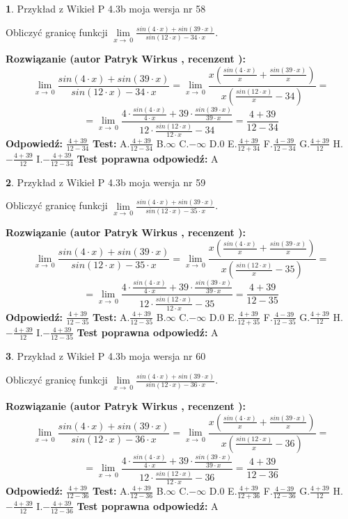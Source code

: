 \documentclass[12pt, a4paper]{article}
\theoremstyle{definition} %
\newtheorem{zad}{}
\newcommand{\zadStart}[1]{\begin{zad}#1\newline}
\newcommand{\zadStop}{\end{zad}}
\newcommand{\rozwStart}[2]{\noindent \textbf{Rozwiązanie (autor #1 , recenzent #2): }\newline}
\newcommand{\rozwStop}{\newline}
\newcommand{\odpStart}{\noindent \textbf{Odpowiedź:}\newline}
\newcommand{\odpStop}{\newline}
\newcommand{\testStart}{\noindent \textbf{Test:}\newline}
\newcommand{\testStop}{\newline}
\newcommand{\kluczStart}{\noindent \textbf{Test poprawna odpowiedź:}\newline}
\newcommand{\kluczStop}{\newline}
\begin{document}
\zadStart{Przykład z Wikieł P 4.3b moja wersja nr 58}


Obliczyć granicę funkcji $\lim\limits_{x\to\ 0}\frac{sin(4 \cdot x)+sin(39 \cdot x)}{sin(12 \cdot x)-34 \cdot x}$.
\zadStop
\rozwStart{Patryk Wirkus}{}
$$\lim\limits_{x\to\ 0}\frac{sin(4 \cdot x)+sin(39 \cdot x)}{sin(12 \cdot x)-34 \cdot x}=\lim\limits_{x\to\ 0}\frac{x(\frac{sin(4 \cdot x)}{x}+\frac{sin(39 \cdot x)}{x})}{x(\frac{sin(12 \cdot x)}{x}-34)}=$$
$$=\lim\limits_{x\to\ 0}\frac{4 \cdot \frac{sin(4 \cdot x)}{4 \cdot x}+39 \cdot \frac{sin(39 \cdot x)}{39 \cdot x}}{12 \cdot \frac{sin(12 \cdot x)}{12 \cdot x}-34}=\frac{4+39}{12-34}$$
\rozwStop
\odpStart
$\frac{4+39}{12-34}$
\odpStop
\testStart
A.$\frac{4+39}{12-34}$
B.$\infty$
C.$-\infty$
D.$0$
E.$\frac{4+39}{12+34}$
F.$\frac{4-39}{12-34}$
G.$\frac{4+39}{12}$
H.$-\frac{4+39}{12}$
I.$-\frac{4+39}{12-34}$
\testStop
\kluczStart
A
\kluczStop



\zadStart{Przykład z Wikieł P 4.3b moja wersja nr 59}


Obliczyć granicę funkcji $\lim\limits_{x\to\ 0}\frac{sin(4 \cdot x)+sin(39 \cdot x)}{sin(12 \cdot x)-35 \cdot x}$.
\zadStop
\rozwStart{Patryk Wirkus}{}
$$\lim\limits_{x\to\ 0}\frac{sin(4 \cdot x)+sin(39 \cdot x)}{sin(12 \cdot x)-35 \cdot x}=\lim\limits_{x\to\ 0}\frac{x(\frac{sin(4 \cdot x)}{x}+\frac{sin(39 \cdot x)}{x})}{x(\frac{sin(12 \cdot x)}{x}-35)}=$$
$$=\lim\limits_{x\to\ 0}\frac{4 \cdot \frac{sin(4 \cdot x)}{4 \cdot x}+39 \cdot \frac{sin(39 \cdot x)}{39 \cdot x}}{12 \cdot \frac{sin(12 \cdot x)}{12 \cdot x}-35}=\frac{4+39}{12-35}$$
\rozwStop
\odpStart
$\frac{4+39}{12-35}$
\odpStop
\testStart
A.$\frac{4+39}{12-35}$
B.$\infty$
C.$-\infty$
D.$0$
E.$\frac{4+39}{12+35}$
F.$\frac{4-39}{12-35}$
G.$\frac{4+39}{12}$
H.$-\frac{4+39}{12}$
I.$-\frac{4+39}{12-35}$
\testStop
\kluczStart
A
\kluczStop



\zadStart{Przykład z Wikieł P 4.3b moja wersja nr 60}


Obliczyć granicę funkcji $\lim\limits_{x\to\ 0}\frac{sin(4 \cdot x)+sin(39 \cdot x)}{sin(12 \cdot x)-36 \cdot x}$.
\zadStop
\rozwStart{Patryk Wirkus}{}
$$\lim\limits_{x\to\ 0}\frac{sin(4 \cdot x)+sin(39 \cdot x)}{sin(12 \cdot x)-36 \cdot x}=\lim\limits_{x\to\ 0}\frac{x(\frac{sin(4 \cdot x)}{x}+\frac{sin(39 \cdot x)}{x})}{x(\frac{sin(12 \cdot x)}{x}-36)}=$$
$$=\lim\limits_{x\to\ 0}\frac{4 \cdot \frac{sin(4 \cdot x)}{4 \cdot x}+39 \cdot \frac{sin(39 \cdot x)}{39 \cdot x}}{12 \cdot \frac{sin(12 \cdot x)}{12 \cdot x}-36}=\frac{4+39}{12-36}$$
\rozwStop
\odpStart
$\frac{4+39}{12-36}$
\odpStop
\testStart
A.$\frac{4+39}{12-36}$
B.$\infty$
C.$-\infty$
D.$0$
E.$\frac{4+39}{12+36}$
F.$\frac{4-39}{12-36}$
G.$\frac{4+39}{12}$
H.$-\frac{4+39}{12}$
I.$-\frac{4+39}{12-36}$
\testStop
\kluczStart
A
\kluczStop
\end{document}
